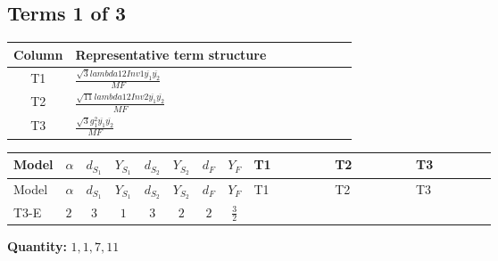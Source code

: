 \documentclass[8pt]{article}
\begin{document}
\begin{landscape}
\subsection*{Terms 1 of 3}
\begin{center}
\begin{tabular}{@{}c >{\raggedright\arraybackslash}p{0.82\linewidth}@{}}
\toprule
Column & Representative term structure \\
\midrule
T1 & \(\displaystyle \frac{\sqrt{3} lambda12Inv1 \overline{y_{1}} \overline{y_{2}}}{MF}\) \\
\midrule
T2 & \(\displaystyle \frac{\sqrt{11} lambda12Inv2 \overline{y_{1}} \overline{y_{2}}}{MF}\) \\
\midrule
T3 & \(\displaystyle \frac{\sqrt{3} g_{1}^{2} \overline{y_{1}} \overline{y_{2}}}{MF}\) \\
\midrule
\bottomrule
\end{tabular}
\end{center}
\smallskip
\tiny
\begin{longtable}{@{}llcccccc >{\raggedright\arraybackslash}p{0.21\linewidth} >{\raggedright\arraybackslash}p{0.21\linewidth} >{\raggedright\arraybackslash}p{0.21\linewidth}@{}}
\toprule
Model & $\alpha$ & $d_{S_1}$ & $Y_{S_1}$ & $d_{S_2}$ & $Y_{S_2}$ & $d_F$ & $Y_F$ & T1 & T2 & T3 \\
\midrule
\endfirsthead
\toprule
Model & $\alpha$ & $d_{S_1}$ & $Y_{S_1}$ & $d_{S_2}$ & $Y_{S_2}$ & $d_F$ & $Y_F$ & T1 & T2 & T3 \\
\midrule
\endhead
T3-E & $2$ & $3$ & $1$ & $3$ & $2$ & $2$ & $\frac{3}{2}$ & \scriptsize\adjustbox{max width=\linewidth}{$\begin{gathered} - \frac{\sqrt{3} lambda12Inv1 \overline{y_{1}} \overline{y_{2}}}{6 MF}\end{gathered}$} & \scriptsize\adjustbox{max width=\linewidth}{$\begin{gathered} \frac{3 \sqrt{11} lambda12Inv2 \overline{y_{1}} \overline{y_{2}}}{22 MF}\end{gathered}$} & \scriptsize\adjustbox{max width=\linewidth}{$\begin{gathered} \frac{9 \sqrt{3} g_{1}^{2} \overline{y_{1}} \overline{y_{2}}}{8 MF}\end{gathered}$} \\
\midrule
\bottomrule
\end{longtable}
\clearpage
\noindent\textbf{Quantity: }$\mathrm{1,1,7,11}$\par\smallskip

\end{landscape}
\end{document}
